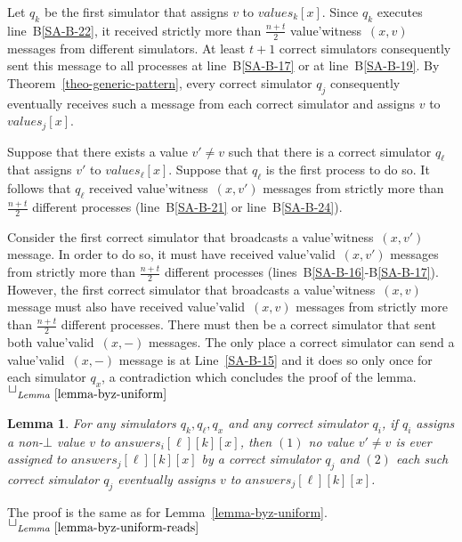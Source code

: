 \documentclass[11pt,letterpaper]{article}
\newtheorem{lemma}{Lemma}
\newlength {\afterproof}
\newcommand{\toto}{xxx}
\newenvironment{proofL}{\noindent{\bf Proof }}
{\hspace*{\fill}$\Box_{\mathit{Lemma}~\ref{\toto}}$\par\vspace{\afterproof}}
\begin{document}
\begin{proofL}
Let $q_k$ be the first simulator that assigns $v$ to $values_k[x]$.
Since $q_k$ executes line~B\ref{SA-B-22},
it received strictly  more than $\frac{n+t}{2}$ {\sc value'witness}~$(x,v)$
messages from different simulators.
At least  $t+1$ correct  simulators consequently sent  this message  to all
processes at line~B\ref{SA-B-17} or at line~B\ref{SA-B-19}.
By Theorem~\ref{theo-generic-pattern},
every  correct  simulator  $q_j$  consequently eventually  receives  such  a
message from each correct simulator and assigns $v$ to $values_j[x]$.

Suppose that there exists a value $v'\neq v$ such that
there is a correct simulator $q_\ell$ that assigns $v'$ to $values_\ell[x]$.
Suppose that $q_\ell$ is the first process to do so.
It follows that $q_\ell$ received {\sc value'witness}~$(x,v')$ messages
from strictly more than $\frac{n+t}{2}$ different processes 
(line~B\ref{SA-B-21} or line~B\ref{SA-B-24}).

Consider the first correct simulator that broadcasts a 
{\sc value'witness}~$(x,v')$ message. In order to do so, it must have 
received {\sc value'valid}~$(x,v')$ messages
from strictly more than $\frac{n+t}{2}$ different processes 
(lines~B\ref{SA-B-16}-B\ref{SA-B-17}).
However, the first correct simulator that broadcasts a 
{\sc value'witness}~$(x,v)$ message must also have 
received {\sc value'valid}~$(x,v)$ messages
from strictly more than $\frac{n+t}{2}$ different processes.
There must then be a correct simulator that sent both 
{\sc value'valid}~$(x,-)$ messages. The only place a correct simulator can 
send a {\sc value'valid}~$(x,-)$ message is at Line~\ref{SA-B-15} and it 
does so only once for each simulator $q_x$, a contradiction which concludes 
the proof of the lemma.
\renewcommand{\toto}{lemma-byz-uniform}
\end{proofL}

\begin{lemma}
For any  simulators $q_k, q_\ell, q_x$  and any correct  simulator $q_i$, if
$q_i$ assigns a non-$\bot$ value $v$  to $answers_i[\ell][k][x]$, then
$(1)$ no value $v'\neq v$ is ever assigned to $answers_j[\ell][k][x]$ by
a  correct simulator  $q_j$ and  $(2)$ each  such  correct  simulator $q_j$
eventually assigns $v$ to $answers_j[\ell][k][x]$.
\label{lemma-byz-uniform-reads}
\end{lemma}

\begin{proofL}
The proof is the same as for Lemma~\ref{lemma-byz-uniform}.
\renewcommand{\toto}{lemma-byz-uniform-reads}
\end{proofL}
\end{document}
